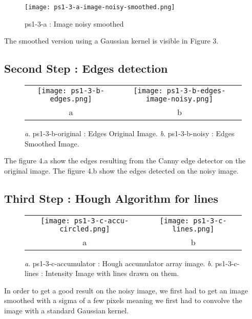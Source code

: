 \documentclass[a4paper,11pt]{article}
\begin{document}
\begin{figure}[H]
\centering
\texttt{[image: ps1-3-a-image-noisy-smoothed.png]}
 \caption{ps1-3-a : Image noisy smoothed }
\label{ps1-3-a}
\end{figure}


The smoothed version using a Gaussian kernel is visible in Figure 3.


\subsection{Second Step : Edges detection}


 \begin{figure}[H]
\begin{center}
\begin{tabular}{cc}
\texttt{[image: ps1-3-b-edges.png]}&
\texttt{[image: ps1-3-b-edges-image-noisy.png]}\\
	a&b
\end{tabular}
\end{center}
 \caption{\textit{a}. ps1-3-b-original : Edges Original Image.  \textit{b}. ps1-3-b-noisy : Edges Smoothed Image. }
\label{ps1-3-b}
\end{figure}

The figure 4.a show the edges resulting from the Canny edge detector on the original image. The figure 4.b show the edges detected on the noisy image.

\subsection{Third Step : Hough Algorithm for lines}

 \begin{figure}[H]
\begin{center}
\begin{tabular}{cc}
\texttt{[image: ps1-3-c-accu-circled.png]}&
\texttt{[image: ps1-3-c-lines.png]}\\
	a&b
\end{tabular}
\end{center}
 \caption{
\textit{a}. ps1-3-c-accumulator : Hough accumulator array image.  \textit{b}. ps1-3-c-lines : Intensity Image with lines drawn on them. }
\label{ps1-3-c}
\end{figure}

In order to get a good result on the noisy image, we first had to get an image smoothed with a sigma of a few pixels meaning we first had to convolve the image with a standard Gaussian kernel.
\end{document}
